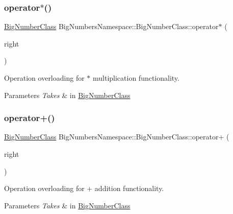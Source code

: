 \subsubsection{\texorpdfstring{operator$\ast$()}{operator*()}}
{\footnotesize\ttfamily \mbox{\hyperlink{class_big_numbers_namespace_1_1_big_number_class}{Big\+Number\+Class}} Big\+Numbers\+Namespace\+::\+Big\+Number\+Class\+::operator$\ast$ (\begin{DoxyParamCaption}\item[{\mbox{\hyperlink{class_big_numbers_namespace_1_1_big_number_class}{Big\+Number\+Class}}}]{right }\end{DoxyParamCaption})}



Operation overloading for $\ast$ multiplication functionality. 


\begin{DoxyParams}{Parameters}
{\em Takes} & in \mbox{\hyperlink{class_big_numbers_namespace_1_1_big_number_class}{Big\+Number\+Class}} \\
\hline
\end{DoxyParams}
\mbox{\label{class_big_numbers_namespace_1_1_big_number_class_aa63331a696556f4d0e3728515cecd166}} 
\subsubsection{\texorpdfstring{operator+()}{operator+()}}
{\footnotesize\ttfamily \mbox{\hyperlink{class_big_numbers_namespace_1_1_big_number_class}{Big\+Number\+Class}} Big\+Numbers\+Namespace\+::\+Big\+Number\+Class\+::operator+ (\begin{DoxyParamCaption}\item[{\mbox{\hyperlink{class_big_numbers_namespace_1_1_big_number_class}{Big\+Number\+Class}}}]{right }\end{DoxyParamCaption})}



Operation overloading for + addition functionality. 


\begin{DoxyParams}{Parameters}
{\em Takes} & in \mbox{\hyperlink{class_big_numbers_namespace_1_1_big_number_class}{Big\+Number\+Class}} \\
\hline
\end{DoxyParams}
\mbox{\label{class_big_numbers_namespace_1_1_big_number_class_a2355731c0d1f103bd68f1e4ff14bc6f4}} 
